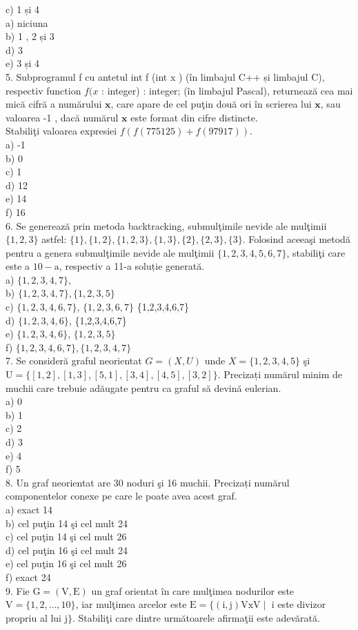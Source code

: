 c) 1 și 4\\
a) niciuna\\
b) 1 , 2 și 3\\
d) 3\\
e) 3 și 4\\
5. Subprogramul f cu antetul int f (int x ) (în limbajul C++ și limbajul C), respectiv function $f(x$ : integer) : integer; (în limbajul Pascal), returnează cea mai mică cifră a numărului $\mathbf{x}$, care apare de cel puţin două ori în scrierea lui $\mathbf{x}$, sau valoarea -1 , dacă numărul $\mathbf{x}$ este format din cifre distincte.\\
Stabiliţi valoarea expresiei $f(f(775125)+f(97917))$.\\
a) -1\\
b) 0\\
c) 1\\
d) 12\\
e) 14\\
f) 16\\
6. Se generează prin metoda backtracking, submulţimile nevide ale mulţimii $\{1,2,3\}$ astfel: $\{1\},\{1,2\},\{1,2,3\},\{1,3\},\{2\},\{2,3\},\{3\}$. Folosind aceeaşi metodă pentru a genera submulţimile nevide ale mulţimii $\{1,2,3,4,5,6,7\}$, stabiliţi care este a $10-\mathrm{a}$, respectiv a 11-a soluție generată.\\
a) $\{1,2,3,4,7\}$,\\
b) $\{1,2,3,4,7\},\{1,2,3,5\}$\\
c) $\{1,2,3,4,6,7\}$, $\{1,2,3,6,7\}$ \{1,2,3,4,6,7\}\\
d) $\{1,2,3,4,6\}$, \{1,2,3,4,6,7\}\\
e) $\{1,2,3,4,6\}$, $\{1,2,3,5\}$\\
f) $\{1,2,3,4,6,7\},\{1,2,3,4,7\}$\\
7. Se consideră graful neorientat $G=(X, U)$ unde $X=\{1,2,3,4,5\}$ şi $\mathrm{U}=\{[1,2],[1,3],[5,1],[3,4],[4,5],[3,2]\}$. Precizați numărul minim de muchii care trebuie adăugate pentru ca graful să devină eulerian.\\
a) 0\\
b) 1\\
c) 2\\
d) 3\\
e) 4\\
f) 5\\
8. Un graf neorientat are 30 noduri şi 16 muchii. Precizați numărul componentelor conexe pe care le poate avea acest graf.\\
a) exact 14\\
b) cel puţin 14 şi cel mult 24\\
c) cel puţin 14 şi cel mult 26\\
d) cel puţin 16 şi cel mult 24\\
e) cel puţin 16 şi cel mult 26\\
f) exact 24\\
9. Fie $\mathrm{G}=(\mathrm{V}, \mathrm{E})$ un graf orientat în care mulţimea nodurilor este $\mathrm{V}=\{1,2, \ldots, 10\}$, iar mulţimea arcelor este $\mathrm{E}=\{(\mathrm{i}, \mathrm{j}) \mathrm{VxV} \mid$ i este divizor propriu al lui j$\}$. Stabiliţi care dintre următoarele afirmaţii este adevărată.

